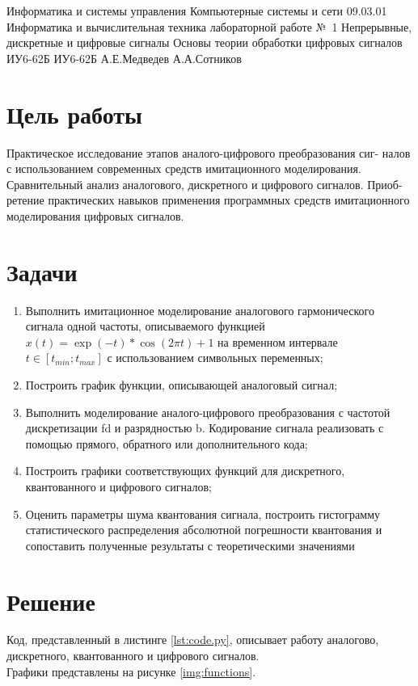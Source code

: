 \documentclass{bmstu}
\begin{document}
\makereporttitle
    {Информатика и системы управления} %
    {Компьютерные системы и сети} %
    {09.03.01 Информатика и вычислительная техника} %
    {лабораторной работе №~1} %
    {Непрерывные, дискретные и цифровые сигналы} %
    {Основы теории обработки цифровых сигналов} %
    {} %
    {ИУ6-62Б} %
    {
    	{ИУ6-62Б}
    	{А.Е.Медведев} %
    	{А.А.Сотников} %
    } 
    

\section*{Цель работы}
Практическое исследование этапов аналого-цифрового преобразования сиг-
налов с использованием современных средств имитационного моделирования.
Сравнительный анализ аналогового, дискретного и цифрового сигналов. Приоб-
ретение практических навыков применения программных средств имитационного
моделирования цифровых сигналов.

\section*{Задачи}
\begin{enumerate} 
\item Выполнить имитационное моделирование аналогового гармонического сигнала одной частоты, описываемого функцией $x(t) = \exp(-t) * \cos(2\pi t) + 1$ на временном интервале $t \in [t_{min} ; t_{max} ]$ с использованием символьных переменных;
\item Построить график функции, описывающей аналоговый сигнал;
\item Выполнить моделирование аналого-цифрового преобразования с частотой дискретизации fd и разрядностью b. Кодирование сигнала реализовать с помощью прямого, обратного или дополнительного кода;
\item Построить графики соответствующих функций для дискретного, квантованного и цифрового сигналов;
\item Оценить параметры шума квантования сигнала, построить гистограмму статистического распределения абсолютной погрешности квантования и сопоставить полученные результаты с теоретическими значениями
\end{enumerate}

\newpage

\section*{Решение}
Код, представленный в листинге \ref{lst:code.py}, описывает работу аналогово, дискретного, квантованного и цифрового сигналов. \\
Графики представлены на рисунке \ref{img:functions}.
\end{document}
